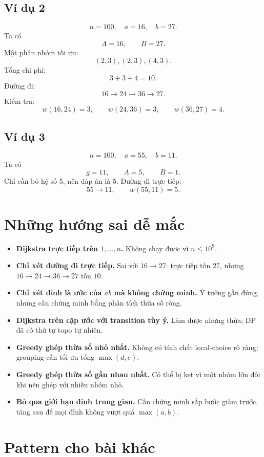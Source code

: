 \documentclass[11pt,a4paper]{article}
\begin{document}
\subsection{Ví dụ 2}

\[
n=100,\quad a=16,\quad b=27.
\]
Ta có
\[
A=16,\qquad B=27.
\]
Một phân nhóm tối ưu:
\[
(2,3),(2,3),(4,3).
\]
Tổng chi phí:
\[
3+3+4=10.
\]
Đường đi:
\[
16\rightarrow 24\rightarrow 36\rightarrow 27.
\]
Kiểm tra:
\[
w(16,24)=3,\qquad w(24,36)=3,\qquad w(36,27)=4.
\]

\subsection{Ví dụ 3}

\[
n=100,\quad a=55,\quad b=11.
\]
Ta có
\[
g=11,\qquad A=5,\qquad B=1.
\]
Chỉ cần bỏ hệ số \(5\), nên đáp án là \(5\). Đường đi trực tiếp:
\[
55\rightarrow 11,\qquad w(55,11)=5.
\]

\section{Những hướng sai dễ mắc}

\begin{itemize}
  \item \textbf{Dijkstra trực tiếp trên \(1,\ldots,n\).} Không chạy được vì \(n\le 10^9\).
  \item \textbf{Chỉ xét đường đi trực tiếp.} Sai với \(16\rightarrow 27\): trực tiếp tốn \(27\), nhưng \(16\rightarrow24\rightarrow36\rightarrow27\) tốn \(10\).
  \item \textbf{Chỉ xét đỉnh là ước của \(ab\) mà không chứng minh.} Ý tưởng gần đúng, nhưng cần chứng minh bằng phân tích thừa số ròng.
  \item \textbf{Dijkstra trên cặp ước với transition tùy ý.} Làm được nhưng thừa; DP đã có thứ tự topo tự nhiên.
  \item \textbf{Greedy ghép thừa số nhỏ nhất.} Không có tính chất local-choice rõ ràng; grouping cần tối ưu tổng \(\max(d,e)\).
  \item \textbf{Greedy ghép thừa số gần nhau nhất.} Có thể bị kẹt vì một nhóm lớn đôi khi nên ghép với nhiều nhóm nhỏ.
  \item \textbf{Bỏ qua giới hạn đỉnh trung gian.} Cần chứng minh sắp bước giảm trước, tăng sau để mọi đỉnh không vượt quá \(\max(a,b)\).
\end{itemize}

\section{Pattern cho bài khác}
\end{document}
